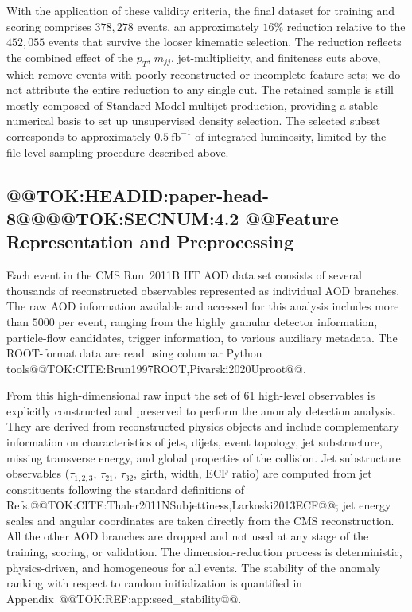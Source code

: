 \documentclass[11pt]{article}
\begin{document}
With the application of these validity criteria, the final dataset for training and scoring comprises $378{,}278$ events, an approximately $16\%$ reduction relative to the $452{,}055$ events that survive the looser kinematic selection. The reduction reflects the combined effect of the $p_T$, $m_{jj}$, jet-multiplicity, and finiteness cuts above, which remove events with poorly reconstructed or incomplete feature sets; we do not attribute the entire reduction to any single cut. The retained sample is still mostly composed of Standard Model multijet production, providing a stable numerical basis to set up unsupervised density selection. The selected subset corresponds to approximately $0.5~\mathrm{fb}^{-1}$ of integrated luminosity, limited by the file-level sampling procedure described above.
\subsection{@@TOK:HEADID:paper-head-8@@@@TOK:SECNUM:4.2 @@Feature Representation and Preprocessing}

Each event in the CMS Run~2011B HT AOD data set consists of several thousands of reconstructed observables represented as individual AOD branches. The raw AOD information available and accessed for this analysis includes more than $5000$ per event, ranging from the highly granular detector information, particle-flow candidates, trigger information, to various auxiliary metadata. The ROOT-format data are read using columnar Python tools@@TOK:CITE:Brun1997ROOT,Pivarski2020Uproot@@.

From this high-dimensional raw input the set of 61 high-level observables is explicitly constructed and preserved to perform the anomaly detection analysis. They are derived from reconstructed physics objects and include complementary information on characteristics of jets, dijets, event topology, jet substructure, missing transverse energy, and global properties of the collision. Jet substructure observables ($\tau_{1,2,3}$, $\tau_{21}$, $\tau_{32}$, girth, width, ECF ratio) are computed from jet constituents following the standard definitions of Refs.@@TOK:CITE:Thaler2011NSubjettiness,Larkoski2013ECF@@; jet energy scales and angular coordinates are taken directly from the CMS reconstruction. All the other AOD branches are dropped and not used at any stage of the training, scoring, or validation. The dimension-reduction process is deterministic, physics-driven, and homogeneous for all events.
The stability of the anomaly ranking with respect to random initialization is quantified in Appendix~@@TOK:REF:app:seed_stability@@.
\end{document}
